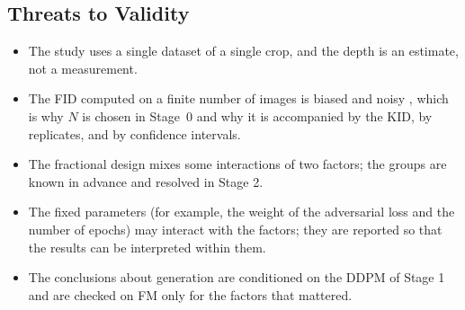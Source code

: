 \subsection{Threats to Validity}

\begin{itemize}
  \item The study uses a single dataset of a single crop, and the depth is an estimate, not a measurement.
  \item The FID computed on a finite number of images is biased and noisy \cite{Chong2020}, which is why $N$ is chosen in Stage~0 and why it is accompanied by the KID, by replicates, and by confidence intervals.
  \item The fractional design mixes some interactions of two factors; the groups are known in advance and resolved in Stage 2.
  \item The fixed parameters (for example, the weight of the adversarial loss and the number of epochs) may interact with the factors; they are reported so that the results can be interpreted within them.
  \item The conclusions about generation are conditioned on the DDPM of Stage 1 and are checked on FM only for the factors that mattered.
\end{itemize}
